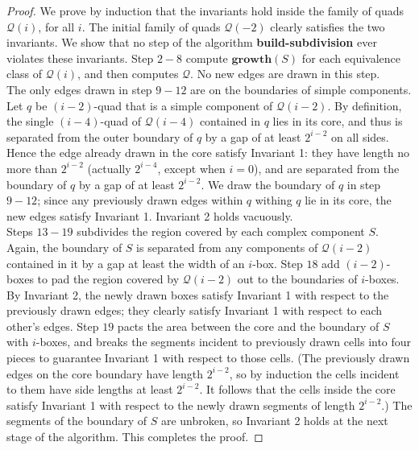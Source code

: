 \begin{proof}
We prove by induction that the invariants hold inside the family of quads $\mathcal{Q}(i)$, for all $i$. The initial family of quads $\mathcal{Q}(-2)$ clearly satisfies the two invariants. We show that no step of the algorithm \textbf{build-subdivision} ever violates these invariants. Step $2-8$ compute $\mathbf{growth}(S)$ for each equivalence class of $\mathcal{Q}(i)$, and then computes $\mathcal{Q}$. No new edges are drawn in this step.\\

The only edges drawn in step $9-12$ are on the boundaries of simple components. Let $q$ be $(i-2)$-quad that is a simple component of $\mathcal{Q}(i-2)$. By definition, the single $(i-4)$-quad of $\mathcal{Q}(i-4)$ contained in $q$ lies in its core, and thus is separated from the outer boundary of $q$ by a gap of at least $2^{i-2}$ on all sides. Hence the edge already drawn in the core satisfy Invariant 1: they have length no more than $2^{i-2}$ (actually $2^{i-4}$, except when $i=0$), and are separated from the boundary of $q$ by a gap of at least $2^{i-2}$. We draw the boundary of $q$ in step $9-12$; since any previously drawn edges within $q$ withing $q$ lie in its core, the new edges satisfy Invariant 1. Invariant 2 holds vacuously. \\

Steps $13-19$ subdivides the region covered by each complex component $S$. Again, the boundary of $S$ is separated from any components of $\mathcal{Q}(i-2)$ contained in it by a gap at least the width of an $i$-box. Step $18$ add $(i-2)$-boxes to pad the region covered by $\mathcal{Q}(i-2)$ out to the boundaries of $i$-boxes. By Invariant 2, the newly drawn boxes satisfy Invariant 1 with respect to the previously drawn edges; they clearly satisfy Invariant 1 with respect to each other's edges. Step $19$ pacts the area between the core and the boundary of $S$ with $i$-boxes, and breaks the segments incident to previously drawn cells into four pieces to guarantee Invariant 1 with respect to those cells. (The previously drawn edges on the core boundary have length $2^{i-2}$, so by induction the cells incident to them have side lengths at least $2^{i-2}$. It follows that the cells inside the core satisfy Invariant 1 with respect to the newly drawn segments of length $2^{i-2}$.) The segments of the boundary of $S$ are unbroken, so Invariant 2 holds at the next stage of the algorithm. This completes the proof.
\end{proof}

